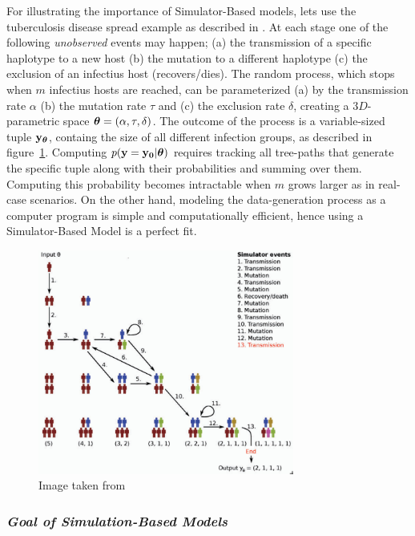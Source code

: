 For illustrating the importance of Simulator-Based models, lets use
the tuberculosis disease spread example as described in
\autocite{Tanaka2006}. At each stage one of the following
\textit{unobserved} events may happen; (a) the transmission of a
specific haplotype to a new host (b) the mutation to a different
haplotype (c) the exclusion of an infectius host (recovers/dies). The
random process, which stops when $m$ infectius hosts are reached, can
be parameterized (a) by the transmission rate $\alpha$ (b) the
mutation rate $\tau$ and (c) the exclusion rate $\delta$, creating a
$3D$-parametric space $\boldsymbol{\theta} = (\alpha, \tau, \delta)$. The outcome
of the process is a variable-sized tuple $\mathbf{y}_{\boldsymbol{\theta}}$, containg the
size of all different infection groups, as described in
figure~\ref{fig:tuberculosis_model}. Computing $p(\mathbf{y}=\mathbf{y_0}|\boldsymbol{\theta})$
requires tracking all tree-paths that generate the specific tuple
along with their probabilities and summing over them. Computing this
probability becomes intractable when $m$ grows larger as in real-case
scenarios. On the other hand, modeling the data-generation process as
a computer program is simple and computationally efficient, hence
using a Simulator-Based Model is a perfect fit.

\begin{figure}[!ht]
    \begin{center}
      \includegraphics[width=0.75\textwidth]{./images/chapter1/tuber_model_1.png}
    \end{center}
    \caption{Image taken from \autocite{Lintusaari2017}}
    \label{fig:tuberculosis_model}
\end{figure}

\subsubsection*{\textit{Goal of Simulation-Based Models}}

